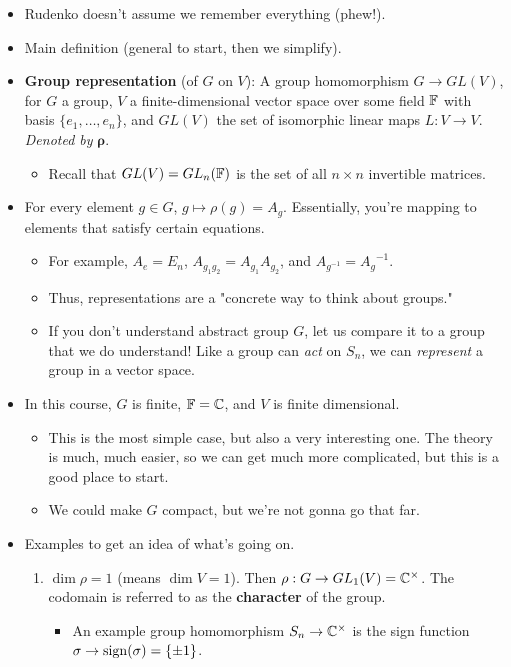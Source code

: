 \documentclass[../notes.tex]{subfiles}
\begin{document}
\begin{itemize}
    \item Rudenko doesn't assume we remember everything (phew!).
    \item Main definition (general to start, then we simplify).
    \item \textbf{Group representation} (of $G$ on $V$): A group homomorphism $G\to GL(V)$, for $G$ a group, $V$ a finite-dimensional vector space over some field $\mathbb{F}$ with basis $\{e_1,\dots,e_n\}$, and $GL(V)$ the set of isomorphic linear maps $L:V\to V$. \emph{Denoted by} $\bm{\rho}$.
    \begin{itemize}
        \item Recall that $GL(V)=GL_n(\mathbb{F})$ is the set of all $n\times n$ invertible matrices.
    \end{itemize}
    \item For every element $g\in G$, $g\mapsto\rho(g)=A_g$. Essentially, you're mapping to elements that satisfy certain equations.
    \begin{itemize}
        \item For example, $A_e=E_n$, $A_{g_1g_2}=A_{g_1}A_{g_2}$, and $A_{g^{-1}}={A_g}^{-1}$.
        \item Thus, representations are a "concrete way to think about groups."
        \item If you don't understand abstract group $G$, let us compare it to a group that we do understand! Like a group can \emph{act} on $S_n$, we can \emph{represent} a group in a vector space.
    \end{itemize}
    \item In this course, $G$ is finite, $\mathbb{F}=\mathbb{C}$, and $V$ is finite dimensional.
    \begin{itemize}
        \item This is the most simple case, but also a very interesting one. The theory is much, much easier, so we can get much more complicated, but this is a good place to start.
        \item We could make $G$ compact, but we're not gonna go that far.
    \end{itemize}
    \item Examples to get an idea of what's going on.
    \begin{enumerate}
        \item $\dim\rho=1$ (means $\dim V=1$). Then $\rho:G\to GL_1(V)=\mathbb{C}^\times$. The codomain is referred to as the \textbf{character} of the group.
        \begin{itemize}
            \item An example group homomorphism $S_n\to\mathbb{C}^\times$ is the sign function $\sigma\to\operatorname{sign}(\sigma)=\{\pm 1\}$.

\end{itemize}
\end{enumerate}
\end{itemize}
\end{document}
